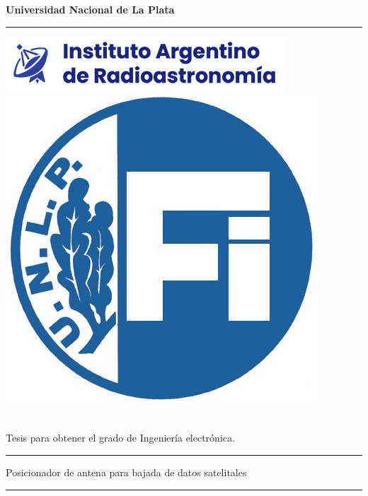 \graphicspath{{portada}}
\begin{titlepage} 
	\begin{center}
{
 \bf{\fontsize{20}{0}\selectfont Universidad Nacional de La Plata }\\[-5mm]
 \rule[-2mm]{1\linewidth}{1mm}	
}

\end{center}
\vspace{-5mm}
\includegraphics{portada/Iar-copia} 
\vspace{15mm}
\centering
\includegraphics[scale=0.7]{portada/fac_ingenieria}
 
{
\textbf{\fontsize{20}{0}{\selectfont{Facultad de ingeniería}}}\\
\vspace{2mm}
\Large Tesis para obtener el grado de Ingeniería electrónica.
}

\rule{1\linewidth}{1mm} 
\vspace{2mm}
{
	\LARGE Posicionador de antena para bajada de datos satelitales
}
\vspace{2mm}
\rule{1\linewidth}{2mm} 

%
%
\end{titlepage}